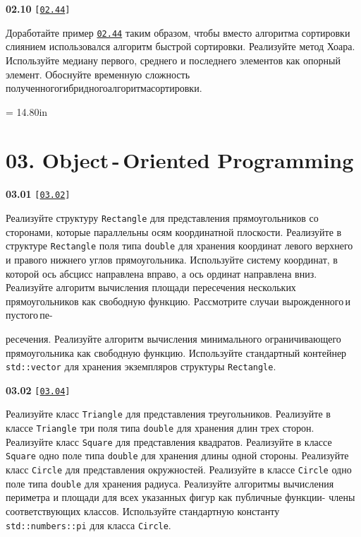 \documentclass[a4paper,12pt]{article}
\begin{document}
\bigskip

{\large \textbf{02.10} \texttt{[\href{https://github.com/i-s-m-mipt/Education/blob/master/projects/examples/source/02.44.cpp}{\texttt{02.44}}]}}

\bigskip

Доработайте пример \href{https://github.com/i-s-m-mipt/Education/blob/master/projects/examples/source/02.44.cpp}{\texttt{02.44}} таким образом, чтобы вместо алгоритма сортировки слиянием использовался алгоритм быстрой сортировки. Реализуйте метод Хоара. Используйте медиану первого, среднего и последнего элементов как опорный элемент. Обоснуйте временную сложность полученного\;гибридного\;алгоритма\;сортировки.



\newpage\thispagestyle{empty}\pdfpageheight = 14.80in\enlargethispage{100in}

\section{03. Object\,-\,Oriented Programming}

{\large \textbf{03.01} \texttt{[\href{https://github.com/i-s-m-mipt/Education/blob/master/projects/examples/source/03.02.cpp}{\texttt{03.02}}]}}

\bigskip

Реализуйте структуру \lstinline{Rectangle} для представления прямоугольников со сторонами, которые параллельны осям координатной плоскости. Реализуйте в структуре \lstinline{Rectangle} поля типа \lstinline{double} для хранения координат левого верхнего и правого нижнего углов прямоугольника. Используйте систему координат, в которой ось абсцисс направлена вправо, а ось ординат направлена вниз. Реализуйте алгоритм вычисления площади пересечения нескольких прямоугольников как свободную функцию. Рассмотрите случаи вырожденного\,и\,пустого\,пе- 

ресечения. Реализуйте алгоритм вычисления минимального ограничивающего прямоугольника как свободную функцию. Используйте стандартный контейнер \lstinline{std::vector} для хранения экземпляров структуры \lstinline{Rectangle}.

\bigskip

{\large \textbf{03.02} \texttt{[\href{https://github.com/i-s-m-mipt/Education/blob/master/projects/examples/source/03.04.cpp}{\texttt{03.04}}]}}

\bigskip

Реализуйте класс \lstinline{Triangle} для представления треугольников. Реализуйте в классе \lstinline{Triangle} три поля типа \lstinline{double} для хранения длин трех сторон. Реализуйте класс \lstinline{Square} для представления квадратов. Реализуйте в классе \lstinline{Square} одно поле типа \lstinline{double} для хранения длины одной стороны. Реализуйте класс \lstinline{Circle} для представления окружностей. Реализуйте в классе \lstinline{Circle} одно поле типа \lstinline{double} для хранения радиуса. Реализуйте алгоритмы вычисления периметра и площади для всех указанных фигур как публичные функции- члены соответствующих классов. Используйте стандартную константу \lstinline{std::numbers::pi} для класса \lstinline{Circle}.
\end{document}

